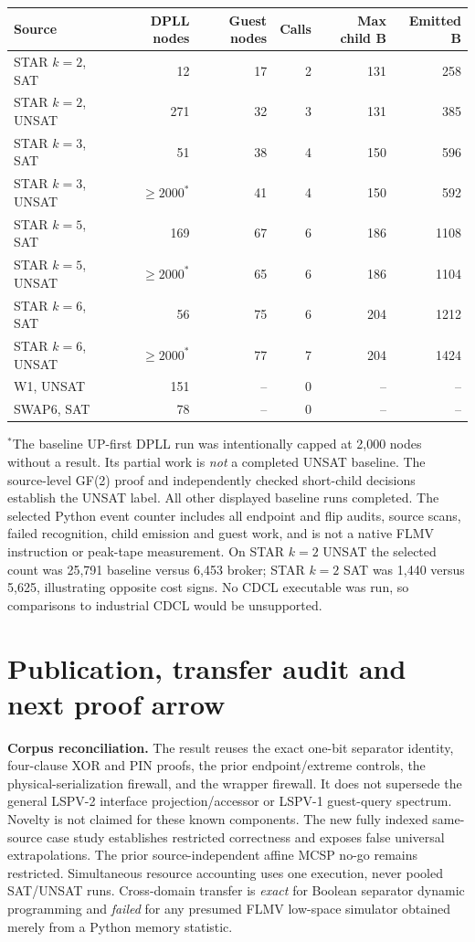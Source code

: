 \documentclass[11pt]{article}
\begin{document}
\begin{center}\begin{tabular}{@{}lrrrrr@{}}\toprule
Source & DPLL nodes & Guest nodes & Calls & Max child B & Emitted B\\\midrule
STAR $k=2$, SAT &12&17&2&131&258\\
STAR $k=2$, UNSAT &271&32&3&131&385\\
STAR $k=3$, SAT &51&38&4&150&596\\
STAR $k=3$, UNSAT &\(\ge 2000^{*}\)&41&4&150&592\\
STAR $k=5$, SAT &169&67&6&186&1108\\
STAR $k=5$, UNSAT &\(\ge 2000^{*}\)&65&6&186&1104\\
STAR $k=6$, SAT &56&75&6&204&1212\\
STAR $k=6$, UNSAT &\(\ge 2000^{*}\)&77&7&204&1424\\
W1, UNSAT &151&--&0&--&--\\
SWAP6, SAT &78&--&0&--&--\\\bottomrule\end{tabular}\end{center}
\noindent $^*$The baseline UP-first DPLL run was intentionally capped at 2,000 nodes without a result. Its partial work is \emph{not} a completed UNSAT baseline. The source-level GF(2) proof and independently checked short-child decisions establish the UNSAT label. All other displayed baseline runs completed. The selected Python event counter includes all endpoint and flip audits, source scans, failed recognition, child emission and guest work, and is not a native FLMV instruction or peak-tape measurement. On STAR $k=2$ UNSAT the selected count was 25,791 baseline versus 6,453 broker; STAR $k=2$ SAT was 1,440 versus 5,625, illustrating opposite cost signs. No CDCL executable was run, so comparisons to industrial CDCL would be unsupported.

\section{Publication, transfer audit and next proof arrow}
\textbf{Corpus reconciliation.} The result reuses the exact one-bit separator identity, four-clause XOR and PIN proofs, the prior endpoint/extreme controls, the physical-serialization firewall, and the wrapper firewall. It does not supersede the general LSPV-2 interface projection/accessor or LSPV-1 guest-query spectrum. Novelty is not claimed for these known components. The new fully indexed same-source case study establishes restricted correctness and exposes false universal extrapolations. The prior source-independent affine MCSP no-go remains restricted. Simultaneous resource accounting uses one execution, never pooled SAT/UNSAT runs. Cross-domain transfer is \emph{exact} for Boolean separator dynamic programming and \emph{failed} for any presumed FLMV low-space simulator obtained merely from a Python memory statistic.
\end{document}
